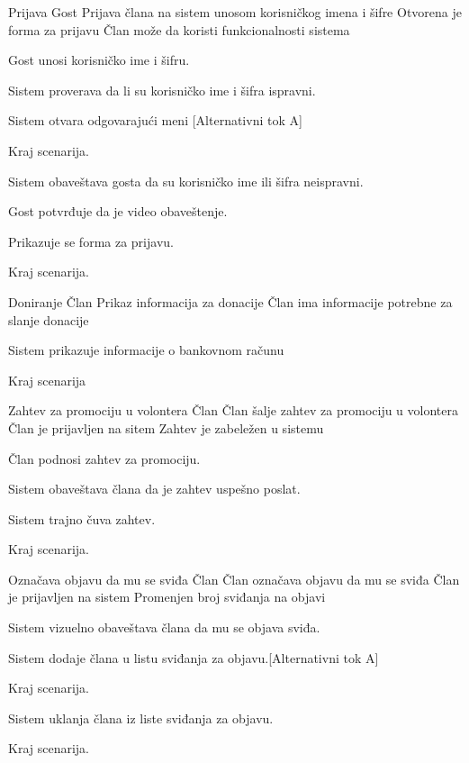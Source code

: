         {Prijava}
        {Gost}
        {Prijava člana na sistem unosom korisničkog imena i šifre}
        {Otvorena je forma za prijavu}
        {Član može da koristi funkcionalnosti sistema}
        {
            \item Gost unosi korisničko ime i šifru.
            \item Sistem proverava da li su korisničko ime i šifra ispravni.
            \item Sistem otvara odgovarajući meni [Alternativni tok A]
            \item Kraj scenarija.
        }
        {
            {
                \item Sistem obaveštava gosta da su korisničko ime ili šifra neispravni.
                \item Gost potvrđuje da je video obaveštenje.
                \item Prikazuje se forma za prijavu.
                \item Kraj scenarija.
            }
        }

         {Doniranje}
         {Član}
         {Prikaz informacija za donacije}
         {}
         {Član ima informacije potrebne za slanje donacije}
         {
            \item Sistem prikazuje informacije o bankovnom računu
            \item Kraj scenarija
         }
         {}

         {Zahtev za promociju u volontera}
         {Član}
         {Član šalje zahtev za promociju u volontera}
         {Član je prijavljen na sitem}
         {Zahtev je zabeležen u sistemu}
         {
            \item Član podnosi zahtev za promociju.
            \item Sistem obaveštava člana da je zahtev uspešno poslat.
            \item Sistem trajno čuva zahtev.
            \item Kraj scenarija.
         }{}

         {Označava objavu da mu se sviđa}
         {Član}
         {Član označava objavu da mu se sviđa}
         {Član je prijavljen na sistem}
         {Promenjen broj sviđanja na objavi}
         {
            \item Sistem vizuelno obaveštava člana da mu se objava sviđa.
            \item Sistem dodaje člana u listu sviđanja za objavu.[Alternativni tok A]
            \item Kraj scenarija.
         }
         {
            {
                \item Sistem uklanja člana iz liste sviđanja za objavu.
                \item Kraj scenarija.
            }
         }

